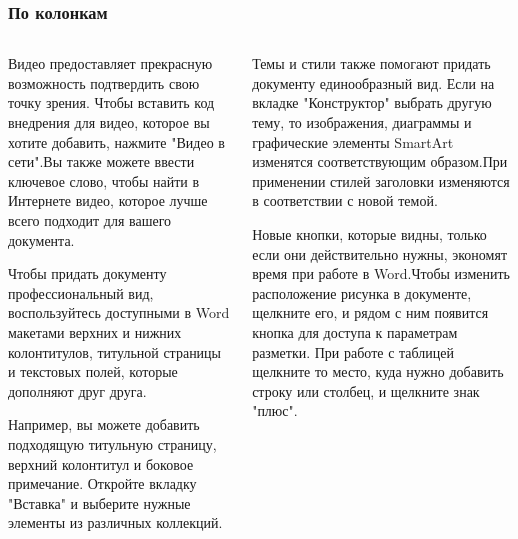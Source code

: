 \documentclass{beamer}
\begin{document}
\begin{frame}
	\frametitle{По колонкам}
	\begin{columns}[t]
		\begin{column}{0.5\textwidth}
			\scriptsize
			
			
			Видео предоставляет прекрасную возможность подтвердить свою точку зрения. Чтобы вставить код внедрения для видео, которое вы хотите добавить, нажмите "Видео в сети".Вы также можете ввести ключевое слово, чтобы найти в Интернете видео, которое лучше всего подходит для вашего документа.
				
						\medskip
			Чтобы придать документу профессиональный вид, воспользуйтесь доступными в Word макетами верхних и нижних колонтитулов, титульной страницы и текстовых полей, которые дополняют друг друга. 
			
			Например, вы можете добавить подходящую титульную страницу, верхний колонтитул и боковое примечание. Откройте вкладку "Вставка" и выберите нужные элементы из различных коллекций.
	\end{column}
	\begin{column}{0.5\textwidth}
				Темы и стили также помогают придать документу единообразный вид. Если на вкладке "Конструктор" выбрать другую тему, то изображения, диаграммы и графические элементы SmartArt изменятся соответствующим образом.При применении стилей заголовки изменяются в соответствии с новой темой.
			
			Новые кнопки, которые видны, только если они действительно нужны, экономят время при работе в Word.Чтобы изменить расположение рисунка в документе, щелкните его, и рядом с ним появится кнопка для доступа к параметрам разметки. При работе с таблицей щелкните то место, куда нужно добавить строку или столбец, и щелкните знак "плюс".
			
		\end{column}
	\end{columns}
\end{frame}
\end{document}
